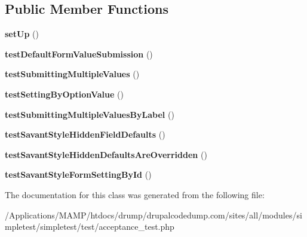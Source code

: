 \subsection*{Public Member Functions}
\begin{DoxyCompactItemize}
\item 
\hypertarget{class_test_of_live_multi_value_widgets_a0a98779918e259ff77210aacaed8fbf1}{
{\bfseries setUp} ()}
\label{class_test_of_live_multi_value_widgets_a0a98779918e259ff77210aacaed8fbf1}

\item 
\hypertarget{class_test_of_live_multi_value_widgets_ab9dcbad0950061dcf739225923023ffb}{
{\bfseries testDefaultFormValueSubmission} ()}
\label{class_test_of_live_multi_value_widgets_ab9dcbad0950061dcf739225923023ffb}

\item 
\hypertarget{class_test_of_live_multi_value_widgets_adf70a1eb6c28f824a310ca51b9357f6c}{
{\bfseries testSubmittingMultipleValues} ()}
\label{class_test_of_live_multi_value_widgets_adf70a1eb6c28f824a310ca51b9357f6c}

\item 
\hypertarget{class_test_of_live_multi_value_widgets_af39cc0ed16ad15ff0dc129b66f66120d}{
{\bfseries testSettingByOptionValue} ()}
\label{class_test_of_live_multi_value_widgets_af39cc0ed16ad15ff0dc129b66f66120d}

\item 
\hypertarget{class_test_of_live_multi_value_widgets_ad137d8d4be0d2cb65c0d7f075003104d}{
{\bfseries testSubmittingMultipleValuesByLabel} ()}
\label{class_test_of_live_multi_value_widgets_ad137d8d4be0d2cb65c0d7f075003104d}

\item 
\hypertarget{class_test_of_live_multi_value_widgets_ab070dbae6a64a7520f10b2fa4606ae77}{
{\bfseries testSavantStyleHiddenFieldDefaults} ()}
\label{class_test_of_live_multi_value_widgets_ab070dbae6a64a7520f10b2fa4606ae77}

\item 
\hypertarget{class_test_of_live_multi_value_widgets_aa3c07b34230ff6cff0b756f906943df1}{
{\bfseries testSavantStyleHiddenDefaultsAreOverridden} ()}
\label{class_test_of_live_multi_value_widgets_aa3c07b34230ff6cff0b756f906943df1}

\item 
\hypertarget{class_test_of_live_multi_value_widgets_aa021ffdd5dc0965769438eb51640270a}{
{\bfseries testSavantStyleFormSettingById} ()}
\label{class_test_of_live_multi_value_widgets_aa021ffdd5dc0965769438eb51640270a}

\end{DoxyCompactItemize}


The documentation for this class was generated from the following file:\begin{DoxyCompactItemize}
\item 
/Applications/MAMP/htdocs/drump/drupalcodedump.com/sites/all/modules/simpletest/simpletest/test/acceptance\_\-test.php\end{DoxyCompactItemize}

